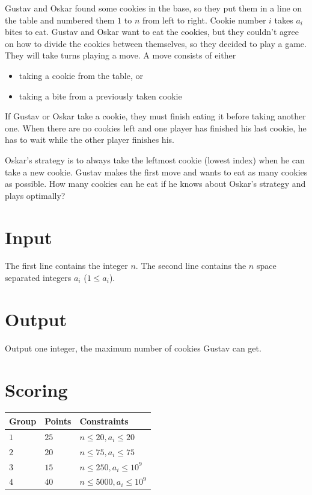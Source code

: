 
\noindent Gustav and Oskar found some cookies in the base, so they put them in a line on the table and numbered them $1$ to $n$ from left to right.
Cookie number $i$ takes $a_i$ bites to eat. Gustav and Oskar want to eat the cookies, but they couldn't agree on how to divide the cookies between themselves,
so they decided to play a game. They will take turns playing a move. A move consists of either
\begin{itemize}
  \item taking a cookie from the table, or
  \item taking a bite from a previously taken cookie
\end{itemize}

\noindent If Gustav or Oskar take a cookie, they must finish eating it before taking another one.
When there are no cookies left and one player has finished his last cookie, he has to wait while the other player finishes his.

Oskar's strategy is to always take the leftmost cookie (lowest index) when he can take a new cookie.
Gustav makes the first move and wants to eat as many cookies as possible. How many cookies can he eat if he knows about Oskar's strategy and plays optimally?

\section*{Input}
The first line contains the integer $n$.
The second line contains the $n$ space separated integers $a_i$ ($1 \leq a_i$).

\section*{Output}
Output one integer, the maximum number of cookies Gustav can get.

\section*{Scoring}

\noindent
\begin{tabular}{| l | l | l |}
\hline
Group & Points     & Constraints \\ \hline
$1$   & $25$       & $n \leq 20, a_i \leq 20$ \\ \hline
$2$   & $20$       & $n \leq 75, a_i \leq 75$ \\ \hline
$3$   & $15$       & $n \leq 250, a_i \leq 10^9$ \\ \hline
$4$   & $40$       & $n \leq 5000, a_i \leq 10^9$ \\ \hline
\end{tabular}

